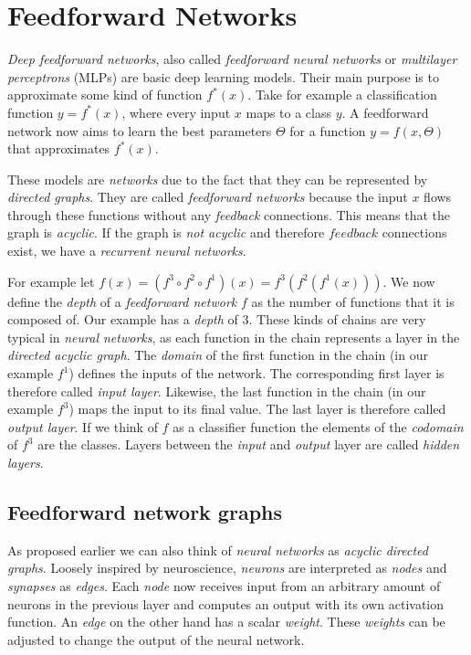 \section{Feedforward Networks}
\label{sec:feedforward-networks}

\emph{Deep feedforward networks}, also called \emph{feedforward neural networks} or \emph{multilayer perceptrons} (MLPs) are basic deep learning models.
Their main purpose is to approximate some kind of function \(f^*(x)\).
Take for example a classification function \(y = f^*(x)\), where every input \(x\) maps to a class \(y\).
A feedforward network now aims to learn the best parameters \(\Theta\) for a function \(y = f(x, \Theta)\) that approximates \(f^*(x)\).

These models are \emph{networks} due to the fact that they can be represented by \emph{directed graphs}.
They are called \emph{feedforward networks} because the input \(x\) flows through these functions without any \emph{feedback} connections.
This means that the graph is \emph{acyclic}.
If the graph is \emph{not acyclic} and therefore \(feedback\) connections exist, we have a \emph{recurrent neural networks}.

For example let \(f(x) = (f^3 \circ f^2 \circ f^1)(x) = f^3(f^2(f^1(x)))\).
We now define the \emph{depth} of a \emph{feedforward network} \(f\) as the number of functions that it is composed of.
Our example has a \emph{depth} of \(3\).
These kinds of chains are very typical in \emph{neural networks}, as each function in the chain represents a layer in the \emph{directed acyclic graph}.
The \emph{domain} of the first function in the chain (in our example \(f^1\)) defines the inputs of the network.
The corresponding first layer is therefore called \emph{input layer}.
Likewise, the last function in the chain (in our example \(f^3\)) maps the input to its final value.
The last layer is therefore called \emph{output layer}.
If we think of \(f\) as a classifier function the elements of the \emph{codomain} of \(f^3\) are the classes.
Layers between the \emph{input} and \emph{output} layer are called \emph{hidden layers}.

\subsection{Feedforward network graphs}
As proposed earlier we can also think of \emph{neural networks} as \emph{acyclic directed graphs}.
Loosely inspired by neuroscience, \emph{neurons} are interpreted as \emph{nodes} and \emph{synapses} as \emph{edges}.
Each \emph{node} now receives input from an arbitrary amount of neurons in the previous layer and computes an output with its own activation function.
An \emph{edge} on the other hand has a scalar \emph{weight}.
These \emph{weights} can be adjusted to change the output of the neural network.

